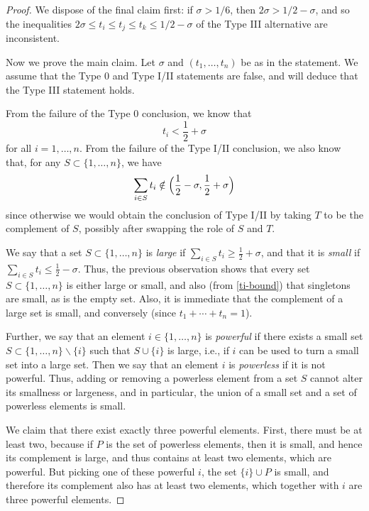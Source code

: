 \documentclass[12pt,a4paper,reqno]{amsart}
\numberwithin{equation}{section}
\theoremstyle{plain}
\theoremstyle{definition}
\begin{document}
\begin{proof}  We dispose of the final claim first: if $\sigma>1/6$, then $2\sigma > 1/2 - \sigma$, and so the inequalities $2\sigma \leq t_i \leq t_j \leq t_k \leq 1/2-\sigma$ of the Type III alternative are inconsistent.  

Now we prove the main claim.  Let $\sigma$ and $(t_1,\ldots,t_n)$ be
as in the statement. We assume that the Type 0 and Type I/II
statements are false, and will deduce that the Type III statement
holds.
\par
From the failure of the Type 0 conclusion, we know that 
\begin{equation}\label{ti-bound}
t_i < \frac{1}{2} + \sigma
\end{equation}
for all $i=1,\ldots,n$.  From the failure of the Type I/II conclusion,
we also know that, for any $S \subset \{1,\ldots,n\}$, we have
$$
\sum_{i \in S} t_i\notin
\Bigl(\frac{1}{2}-\sigma,\frac{1}{2}+\sigma\Bigr)
$$
since otherwise we would obtain the conclusion of Type I/II by taking
$T$ to be the complement of $S$, possibly after swapping the role of
$S$ and $T$.
\par
We say that a set $S \subset \{1,\ldots,n\}$ is \emph{large} if
$\sum_{i \in S} t_i \geq \frac{1}{2}+\sigma$, and that it is
\emph{small} if $\sum_{i \in S} t_i \leq \frac{1}{2} - \sigma$. Thus,
the previous observation shows that every set $S \subset
\{1,\ldots,n\}$ is either large or small, and also (from
\eqref{ti-bound}) that singletons are small, as is the empty set.
Also, it is immediate that the complement of a large set is small, and
conversely (since $t_1+\cdots+t_n=1$).
\par
Further, we say that an element $i \in \{1,\ldots,n\}$ is
\emph{powerful} if there exists a small set $S \subset \{1,\ldots,n\}
\backslash \{i\}$ such that $S \cup \{i\}$ is large, i.e., if $i$ can
be used to turn a small set into a large set. Then we say that an
element $i$ is \emph{powerless} if it is not powerful. Thus, adding or
removing a powerless element from a set $S$ cannot alter its smallness
or largeness, and in particular, the union of a small set and a set of
powerless elements is small.

We claim that there exist exactly three powerful elements. First,
there must be at least two, because if $P$ is the set of powerless
elements, then it is small, and hence its complement is large, and
thus contains at least two elements, which are powerful. But picking
one of these powerful $i$, the set $\{i\}\cup P$ is small, and
therefore its complement also has at least two elements, which
together with $i$ are three powerful elements.


\end{proof}
\end{document}
